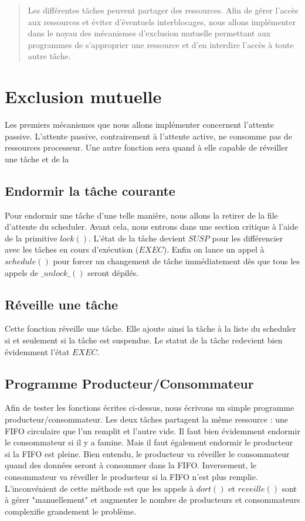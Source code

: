 \begin{abstract}
Les différentes tâches peuvent partager des ressources. Afin de gérer l'accès aux ressources et éviter d'éventuels interblocages, nous allons implémenter dans le noyau des mécanismes d'exclusion mutuelle permettant aux programmes de s'approprier une ressource et d'en interdire l'accès à toute autre tâche.
\end{abstract}

\section{Exclusion mutuelle}
Les premiers mécanismes que nous allons implémenter concernent l'attente passive. L'attente passive, contrairement à l'attente active, ne consomme pas de ressources processeur.
Une autre fonction sera quand à elle capable de réveiller une tâche et de la 

\subsection{Endormir la tâche courante}
Pour endormir une tâche d'une telle manière, nous allons la retirer de la file d'attente du scheduler. Avant cela, nous entrons dans une section critique à l'aide de la primitive $lock()$. L'état de la tâche devient $SUSP$ pour les différencier avec les tâches en cours d'exécution ($EXEC$). Enfin on lance un appel à $schedule()$ pour forcer un changement de tâche immédiatement dès que tous les appels de $\_unlock\_()$ seront dépilés.


\subsection{Réveille une tâche}
Cette fonction réveille une tâche. Elle ajoute ainsi la tâche à la liste du scheduler si et seulement si la tâche est suspendue. Le statut de la tâche redevient bien évidemment l'état $EXEC$.


\subsection{Programme Producteur/Consommateur}
Afin de tester les fonctions écrites ci-dessus, nous écrivons un simple programme producteur/consommateur. Les deux tâches partagent la même ressource : une FIFO circulaire que l'un remplit et l'autre vide.
Il faut bien évidemment endormir le consommateur si il y a famine. Mais il faut également endormir le producteur si la FIFO est pleine.
Bien entendu, le producteur va réveiller le consommateur quand des données seront à consommer dans la FIFO. Inversement, le consommateur va réveiller le producteur si la FIFO n'est plus remplie.
L'inconvénient de cette méthode est que les appels à $dort()$ et $reveille()$ sont à gérer "manuellement" et augmenter le nombre de producteurs et consommateurs complexifie grandement le problème.

